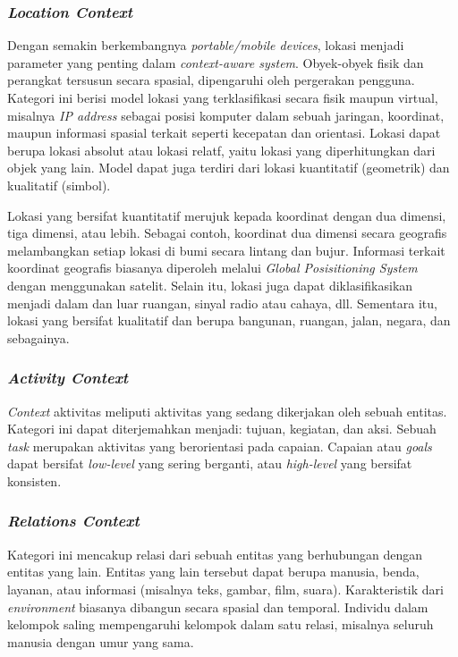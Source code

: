 \subsubsection{\textit{Location Context}}
\label{sssec:location-context}
Dengan semakin berkembangnya \textit{portable/mobile devices}, lokasi menjadi parameter yang penting dalam \textit{context-aware system}. Obyek-obyek fisik dan perangkat tersusun secara spasial, dipengaruhi oleh pergerakan pengguna. Kategori ini berisi model lokasi yang terklasifikasi secara fisik maupun virtual, misalnya \textit{IP address} sebagai posisi komputer dalam sebuah jaringan, koordinat, maupun informasi spasial terkait seperti kecepatan dan orientasi. Lokasi dapat berupa lokasi absolut atau lokasi relatf, yaitu lokasi yang diperhitungkan dari objek yang lain. Model dapat juga terdiri dari lokasi kuantitatif (geometrik) dan kualitatif (simbol).


Lokasi yang bersifat kuantitatif merujuk kepada koordinat dengan dua dimensi, tiga dimensi, atau lebih. Sebagai contoh, koordinat dua dimensi secara geografis melambangkan setiap lokasi di bumi secara lintang dan bujur. Informasi terkait koordinat geografis biasanya diperoleh melalui \textit{Global Posisitioning System} dengan menggunakan satelit. Selain itu, lokasi juga dapat diklasifikasikan menjadi dalam dan luar ruangan, sinyal radio atau cahaya, dll. Sementara itu, lokasi yang bersifat kualitatif dan berupa bangunan, ruangan, jalan, negara, dan sebagainya. 


\subsubsection{\textit{Activity Context}}
\label{sssec:activity-context}
\textit{Context} aktivitas meliputi aktivitas yang sedang dikerjakan oleh sebuah entitas. Kategori ini dapat diterjemahkan menjadi: tujuan, kegiatan, dan aksi. Sebuah \textit{task} merupakan aktivitas yang berorientasi pada capaian. Capaian atau \textit{goals} dapat bersifat \textit{low-level} yang sering berganti, atau \textit{high-level} yang bersifat konsisten.


\subsubsection{\textit{Relations Context}}
\label{sssec:relations-context}
Kategori ini mencakup relasi dari sebuah entitas yang berhubungan dengan entitas yang lain. Entitas yang lain tersebut dapat berupa manusia, benda, layanan, atau informasi (misalnya teks, gambar, film, suara). Karakteristik dari \textit{environment} biasanya dibangun secara spasial dan temporal. Individu dalam kelompok saling mempengaruhi kelompok dalam satu relasi, misalnya seluruh manusia dengan umur yang sama.


